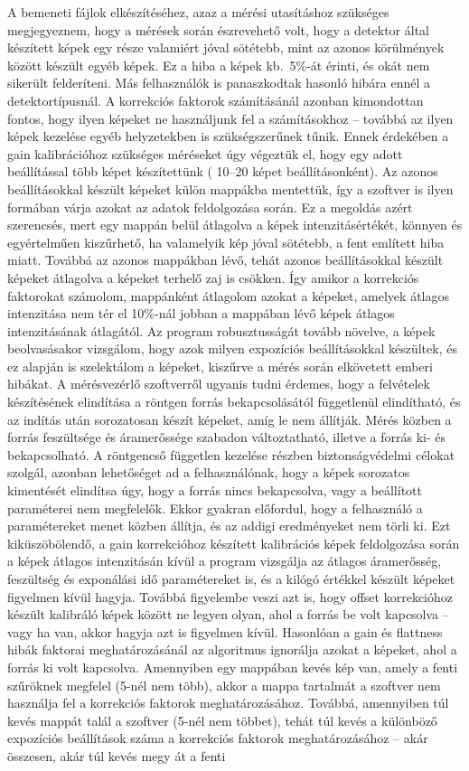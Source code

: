\documentclass[a4paper,12pt]{article}
\begin{document}
 
A bemeneti fájlok elkészítéséhez, azaz a mérési utasításhoz szükséges megjegyeznem, hogy a mérések során észrevehető volt, hogy a detektor által készített képek egy része valamiért jóval sötétebb, mint az azonos körülmények között készült egyéb képek. Ez a hiba a képek kb.\ 5\%-át érinti, és okát nem sikerült felderíteni. Más felhasználók is panaszkodtak hasonló hibára ennél a detektortípusnál. A korrekciós faktorok számításánál azonban kimondottan fontos, hogy ilyen képeket ne használjunk fel a számításokhoz -- továbbá az ilyen képek kezelése egyéb helyzetekben is szükségszerűnek tűnik. Ennek érdekében a gain kalibrációhoz szükséges méréseket úgy végeztük el, hogy egy adott beállítással több képet készítettünk ( 10--20 képet beállításonként). Az azonos beállításokkal készült képeket külön mappákba mentettük, így a szoftver is ilyen formában várja azokat az adatok feldolgozása során. Ez a megoldás azért szerencsés, mert egy mappán belül átlagolva a képek intenzitásértékét, könnyen és egyértelműen kiszűrhető, ha valamelyik kép jóval sötétebb, a fent említett hiba miatt. Továbbá az azonos mappákban lévő, tehát azonos beállításokkal készült képeket átlagolva a képeket terhelő zaj is csökken. Így amikor a korrekciós faktorokat számolom, mappánként átlagolom azokat a képeket, amelyek átlagos intenzitása nem tér el 10\%-nál jobban a mappában lévő képek átlagos intenzitásának átlagától. Az program  robusztusságát  tovább növelve, a képek beolvasásakor vizsgálom, hogy  azok milyen expozíciós beállításokkal készültek, és ez alapján is szelektálom a képeket, kiszűrve a mérés során elkövetett emberi hibákat. A mérésvezérlő szoftverről ugyanis tudni érdemes, hogy a felvételek készítésének elindítása a röntgen forrás bekapcsolásától függetlenül elindítható, és az indítás után sorozatosan készít képeket, amíg le nem állítják. Mérés közben a forrás feszültsége és áramerőssége szabadon változtatható, illetve a forrás ki- és bekapcsolható. A röntgencső független kezelése részben biztonságvédelmi célokat szolgál, azonban lehetőséget ad a felhasználónak, hogy a képek sorozatos kimentését elindítsa úgy, hogy a forrás nincs bekapcsolva, vagy a beállított paraméterei nem megfelelők. Ekkor gyakran előfordul, hogy a felhasználó a paramétereket menet közben állítja, és az addigi eredményeket nem törli ki. Ezt kiküszöbölendő, a gain korrekcióhoz készített kalibrációs képek feldolgozása során a képek átlagos intenzitásán kívül a program vizsgálja az átlagos áramerősség, feszültség és exponálási idő paramétereket is, és a kilógó értékkel készült képeket figyelmen kívül hagyja. Továbbá figyelembe veszi azt is, hogy offset korrekcióhoz készült kalibráló képek között ne legyen olyan, ahol a forrás be volt kapcsolva -- vagy ha van, akkor hagyja azt is figyelmen kívül. Hasonlóan a gain és flattness hibák faktorai meghatározásánál az algoritmus ignorálja azokat a képeket, ahol a forrás ki volt kapcsolva. Amennyiben egy mappában kevés kép van, amely a fenti szűröknek megfelel (5-nél nem több), akkor a mappa tartalmát a szoftver nem használja fel a korrekciós faktorok meghatározásához. Továbbá, amennyiben túl kevés mappát talál a szoftver (5-nél nem többet), tehát túl kevés a különböző expozíciós beállítások száma a korrekciós faktorok meghatározásához -- akár összesen, akár túl kevés megy át a fenti 
\end{document}
